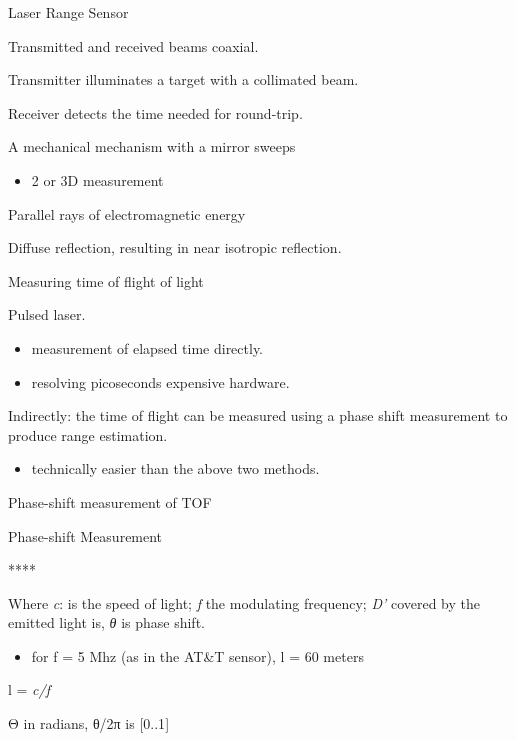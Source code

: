 \documentclass[compress]{beamer}
\begin{document}
\begin{frame}{Laser Range Sensor}

Transmitted and received beams coaxial.

Transmitter illuminates a target with a collimated beam.

Receiver detects the time needed for round-trip.

A mechanical mechanism with a mirror sweeps

\begin{itemize}

\item
  2 or 3D measurement
\end{itemize}

Parallel rays of electromagnetic energy

Diffuse reflection, resulting in near isotropic reflection.

\end{frame}

\begin{frame}{Measuring time of flight of light}

Pulsed laser.

\begin{itemize}

\item
  measurement of elapsed time directly.
\item
  resolving picoseconds \rightarrow expensive hardware.
\end{itemize}

Indirectly: the time of flight can be measured using a phase shift
measurement to produce range estimation.

\begin{itemize}

\item
  technically easier than the above two methods.
\end{itemize}

\end{frame}

\begin{frame}{Phase-shift measurement of TOF}

Phase-shift Measurement

\end{frame}

\begin{frame}{****}

\end{frame}

\begin{frame}{Where \emph{c}: is the speed of light; \emph{f} the
modulating frequency; \emph{D'} covered by the emitted light is,
\emph{θ} is phase shift.}

\begin{itemize}

\item
  for f = 5 Mhz (as in the AT\&T sensor), l = 60 meters
\end{itemize}

l = \emph{c/f}

Θ in radians, θ/2π is {[}0..1{]}

\end{frame}
\end{document}
